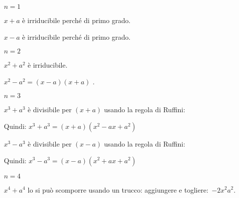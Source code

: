 \begin{itemize*}
\item \(n=1\)
 \begin{itemize*}
  \item \(x+a\) è irriducibile perché di primo grado.
  \item \(x-a\) è irriducibile perché di primo grado.
 \end{itemize*}

 \item \(n=2\)
 \begin{itemize*}
  \item \(x^2+a^2\) è irriducibile.
  \item \(x^2-a^2=(x-a)(x+a)\) .
 \end{itemize*}

 \item \(n=3\)
 \begin{itemize*}
  \item 
 \begin{multicols}{2}
  \(x^3+a^3\) è divisibile per \((x+a)\) usando la regola di Ruffini:
   \begin{inaccessibleblock}
    \begin{center}
%     
    \binomogeneiruffinia
    \end{center}
    \end{inaccessibleblock}
 \end{multicols}
   Quindi: \(x^3+a^3=(x+a)(x^2-ax+a^2)\)
  \item 
 \begin{multicols}{2}
  \(x^3-a^3\) è divisibile per \((x-a)\) usando la regola di Ruffini:
   \begin{inaccessibleblock}
    \begin{center}
%     
    \binomogeneiruffinib
    \end{center}
    \end{inaccessibleblock}
 \end{multicols}
   Quindi: \(x^3-a^3=(x-a)(x^2+ax+a^2)\)
 \end{itemize*}

 \item \(n=4\)
 \begin{itemize*}
  \item \(x^4+a^4\) lo si può scomporre usando un trucco: 
   aggiungere e togliere:~\(-2x^2a^2\).
   

\end{itemize*}
\end{itemize*}
